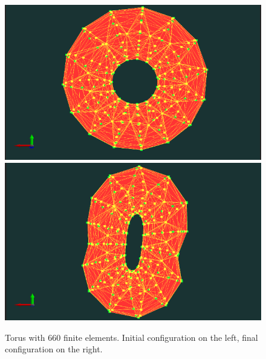 \documentclass[en]{minipw} %
\begin{document}
\begin{figure}[h!]
\centering
\includegraphics[scale=0.3]{pictures/tests/660.png}
\includegraphics[scale=0.3]{pictures/tests/660_end.png}
\caption[Torus with 660 finite elements]{Torus with 660 finite elements. Initial configuration on the left, final configuration on the right.}
\label{fig:torus660}
\end{figure}
\end{document}
